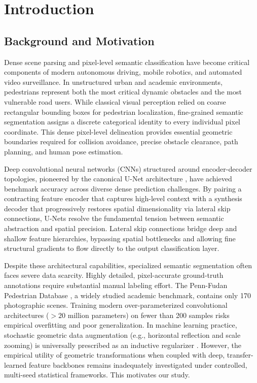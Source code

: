 \documentclass[10pt,a4paper]{article}
\begin{document}
\clearpage


\section{Introduction}

\subsection{Background and Motivation}
Dense scene parsing and pixel-level semantic classification have become critical components of modern autonomous driving, mobile robotics, and automated video surveillance. In unstructured urban and academic environments, pedestrians represent both the most critical dynamic obstacles and the most vulnerable road users. While classical visual perception relied on coarse rectangular bounding boxes for pedestrian localization, fine-grained semantic segmentation assigns a discrete categorical identity to every individual pixel coordinate. This dense pixel-level delineation provides essential geometric boundaries required for collision avoidance, precise obstacle clearance, path planning, and human pose estimation.

Deep convolutional neural networks (CNNs) structured around encoder-decoder topologies, pioneered by the canonical U-Net architecture \cite{ronneberger2015unet}, have achieved benchmark accuracy across diverse dense prediction challenges. By pairing a contracting feature encoder that captures high-level context with a synthesis decoder that progressively restores spatial dimensionality via lateral skip connections, U-Nets resolve the fundamental tension between semantic abstraction and spatial precision. Lateral skip connections bridge deep and shallow feature hierarchies, bypassing spatial bottlenecks and allowing fine structural gradients to flow directly to the output classification layer.

Despite these architectural capabilities, specialized semantic segmentation often faces severe data scarcity. Highly detailed, pixel-accurate ground-truth annotations require substantial manual labeling effort. The Penn-Fudan Pedestrian Database \cite{wang2007object}, a widely studied academic benchmark, contains only 170 photographic scenes. Training modern over-parameterized convolutional architectures ($>20$ million parameters) on fewer than 200 samples risks empirical overfitting and poor generalization. In machine learning practice, stochastic geometric data augmentation (e.g., horizontal reflection and scale zooming) is universally prescribed as an inductive regularizer \cite{shorten2019survey}. However, the empirical utility of geometric transformations when coupled with deep, transfer-learned feature backbones remains inadequately investigated under controlled, multi-seed statistical frameworks. This motivates our study.
\end{document}
